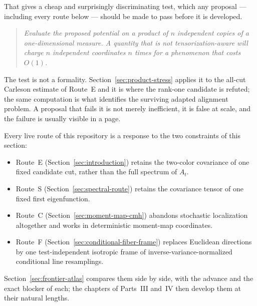 \documentclass[../../main.tex]{subfiles}
\begin{document}
That gives a cheap and surprisingly discriminating test, which any proposal --- including every
route below --- should be made to pass before it is developed.

\begin{quote}
  \emph{Evaluate the proposed potential on a product of $n$ independent copies of a
  one-dimensional measure. A quantity that is not tensorization-aware will charge $n$ independent
  coordinates $n$ times for a phenomenon that costs $O(1)$.}
\end{quote}

The test is not a formality. Section~\ref{sec:product-stress} applies it to the all-cut Carleson
estimate of Route~E and it is where the rank-one candidate is refuted; the same computation is
what identifies the surviving adapted alignment problem. A proposal that fails it is not merely
inefficient, it is false at scale, and the failure is usually visible in a page.

Every live route of this repository is a response to the two constraints of this section:

\begin{itemize}[leftmargin=1.6em]
  \item Route~E (Section~\ref{sec:introduction}) retains the two-color covariance of one fixed
  candidate cut, rather than the full spectrum of $A_t$.
  \item Route~S (Section~\ref{sec:spectral-route}) retains the covariance tensor of one fixed
  first eigenfunction.
  \item Route~C (Section~\ref{sec:moment-map-cmh}) abandons stochastic localization altogether
  and works in deterministic moment-map coordinates.
  \item Route~F (Section~\ref{sec:conditional-fiber-frame}) replaces Euclidean directions by one
  test-independent isotropic frame of inverse-variance-normalized conditional line resamplings.
\end{itemize}

Section~\ref{sec:frontier-atlas} compares them side by side, with the advance and the exact
blocker of each; the chapters of Parts~III and~IV then develop them at their natural lengths.
\end{document}
